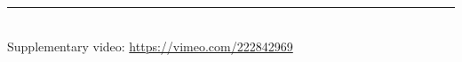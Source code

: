 


\vspace{2cm}
\noindent\rule{10cm}{0.4pt}\\
Supplementary video: \url{https://vimeo.com/222842969}

  



